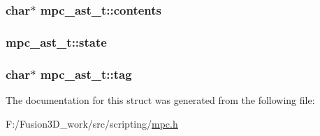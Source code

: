 \subsubsection[{contents}]{\setlength{\rightskip}{0pt plus 5cm}char$\ast$ mpc\+\_\+ast\+\_\+t\+::contents}\label{structmpc__ast__t_a9a3f82e99e8dd914e114b0f2b9124a84}
\hypertarget{structmpc__ast__t_ae9912025c4623ef2635af8cf3dbbd882}{}
\subsubsection[{state}]{ mpc\+\_\+ast\+\_\+t\+::state}\label{structmpc__ast__t_ae9912025c4623ef2635af8cf3dbbd882}
\hypertarget{structmpc__ast__t_a818310eeb75fc5f4750878ac0a5a0f4d}{}
\subsubsection[{tag}]{\setlength{\rightskip}{0pt plus 5cm}char$\ast$ mpc\+\_\+ast\+\_\+t\+::tag}\label{structmpc__ast__t_a818310eeb75fc5f4750878ac0a5a0f4d}


The documentation for this struct was generated from the following file\+:\begin{DoxyCompactItemize}
\item 
F\+:/\+Fusion3\+D\+\_\+work/src/scripting/\hyperlink{mpc_8h}{mpc.\+h}\end{DoxyCompactItemize}
